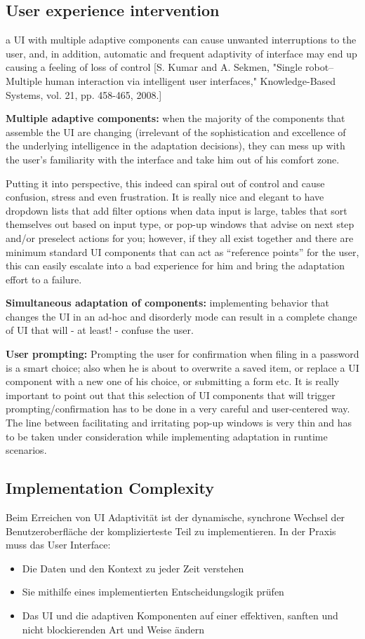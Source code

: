\subsection{User experience intervention}
a UI with multiple adaptive components can cause unwanted interruptions to the user, and, in addition,
automatic and frequent adaptivity of interface may end up causing a feeling of loss of control [S. Kumar and A. Sekmen, "Single robot–Multiple human interaction via intelligent user interfaces," Knowledge-Based Systems, vol. 21, pp. 458-465, 2008.]

\textbf{Multiple adaptive components:} when the majority of the components that assemble the UI are
changing (irrelevant of the sophistication and excellence of the underlying intelligence in the adaptation decisions),
they can mess up with the user’s familiarity with the interface and take him out of his comfort zone.

Putting it into perspective, this indeed can spiral out of control and cause confusion,
stress and even frustration. It is really nice and elegant to have dropdown lists that add filter options when data input is large,
tables that sort themselves out based on input type, or pop-up windows that advise on next step and/or preselect actions for you; however,
if they all exist together and there are minimum standard UI components that can act as “reference points” for the user,
this can easily escalate into a bad experience for him and bring the adaptation effort to a failure.

\textbf{Simultaneous adaptation of components:} implementing behavior that changes the UI in an ad-hoc and disorderly mode can result
in a complete change of UI that will - at least! - confuse the user.

\textbf{User prompting:} Prompting the user for confirmation when filing in a password is a smart choice; also when he is about to overwrite a saved item,
or replace a UI component with a new one of his choice, or submitting a form etc. It is really important to point out that
this selection of UI components that will trigger prompting/confirmation has to be done in a very careful and user-centered way.
The line between facilitating and irritating pop-up windows is very thin and has to be taken under consideration while
implementing adaptation in runtime scenarios.

\subsection{Implementation Complexity}
Beim Erreichen von UI Adaptivität ist der dynamische, synchrone Wechsel der Benutzeroberfläche der komplizierteste Teil zu implementieren. 
In der Praxis muss das User Interface:
\begin{itemize}
    \item Die Daten und den Kontext zu jeder Zeit verstehen
    \item Sie mithilfe eines implementierten Entscheidungslogik prüfen
    \item Das UI und die adaptiven Komponenten auf einer effektiven, sanften und nicht blockierenden Art und Weise ändern
\end{itemize}

